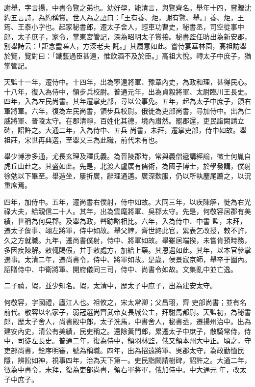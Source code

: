 
\begin{pinyinscope}

 謝舉，字言揚，中書令覽之弟也。幼好學，能清言，與覽齊名。舉年十四，嘗贈沈約五言詩，為約稱賞。世人為之語曰：「王有養、炬，謝有覽、舉。」養、炬，王筠、王泰小字也。起家秘書郎，遷太子舍人，輕車功曹史，秘書丞，司空從事中郎，太子庶子，家令，掌東宮管記，深為昭明太子賞接。秘書監任昉出為新安郡，別舉詩云：「詎念耋嗟人，方深老夫
 託。」其屬意如此。嘗侍宴華林園，高祖訪舉於覽，覽對曰：「識藝過臣甚遠，惟飲酒不及於臣。」高祖大悅。轉太子中庶子，猶掌管記。



 天監十一年，遷侍中。十四年，出為寧遠將軍、豫章內史，為政和理，甚得民心。十八年，復入為侍中，領步兵校尉。普通元年，出為貞毅將軍、太尉臨川王長史。四年，入為左民尚書。其年遷掌吏部，尋以公事免。五年，起為太子中庶子，領右軍將軍。六年，復為左民尚書，領步兵校尉。俄徙為吏部尚書，尋加侍中。出為仁威將軍、晉陵太守。在郡清靜，百姓化其德，境內肅然。罷郡還，吏民詣闕請立碑，詔許之。大通二年，入為侍中、五兵
 尚書，未拜，遷掌吏部，侍中如故。舉祖莊，宋世再典選，至舉又三為此職，前代未有也。



 舉少博涉多通，尤長玄理及釋氏義。為晉陵郡時，常與義僧遞講經論，徵士何胤自虎丘山赴之。其盛如此。先是，北渡人盧廣有儒術，為國子博士，於學發講，僕射徐勉以下畢至。舉造坐，屢折廣，辭理通邁。廣深歎服，仍以所執麈尾薦之，以況重席焉。



 四年，加侍中。五年，遷尚書右僕射，侍中如故。大同三年，以疾陳解，徙為右光祿大夫，給親信二十人。其年，出為雲麾將軍、吳郡太守。先是，何敬容居郡有美績，世稱為何吳郡。及舉為政，聲跡略相比。六年，入為侍中、中書
 監，未拜，遷太子詹事、翊左將軍，侍中如故。舉父綍，齊世終此官，累表乞改授，敕不許，久之方就職。九年，遷尚書僕射，侍中、將軍如故。舉雖居端揆，未嘗肯預時務，多因疾陳解。敕輒賜假，并手敕處方，加給上藥。其恩遇如此。其年，以本官參掌選事。太清二年，遷尚書令，侍中、將軍如故。是歲，侯景寇京師，舉卒于圍內。詔贈侍中、中衛將軍、開府儀同三司，侍中、尚書令如故。文集亂中並亡逸。



 二子禧，嘏，並少知名。嘏，太清中，歷太子中庶子，出為建安太守。



 何敬容，字國禮，廬江人也。祖攸之，宋太常卿；父昌珝，齊
 吏部尚書；並有名前代。敬容以名家子，弱冠選尚齊武帝女長城公主，拜駙馬都尉。天監初，為秘書郎，歷太子舍人，尚書殿中郎，太子洗馬，中書舍人，秘書丞，遷揚州治中。出為建安內史，清公有美績，民吏稱之。還除黃門郎，累遷太子中庶子，散騎常侍，侍中，司徒左長史。普通二年，復為侍中，領羽林監，俄又領本州大中正。頃之，守吏部尚書，銓序明審，號為稱職。四年，出為招遠將軍、吳郡太守，為政勤恤民隱，辨訟如神，視事四年，治為天下第一。吏民詣闕請樹碑，詔許之。大通二年，徵為中書令，未拜，復為吏部尚書，領右軍將軍，俄加侍中。中大通元
 年，改太子中庶子。




\end{pinyinscope}
